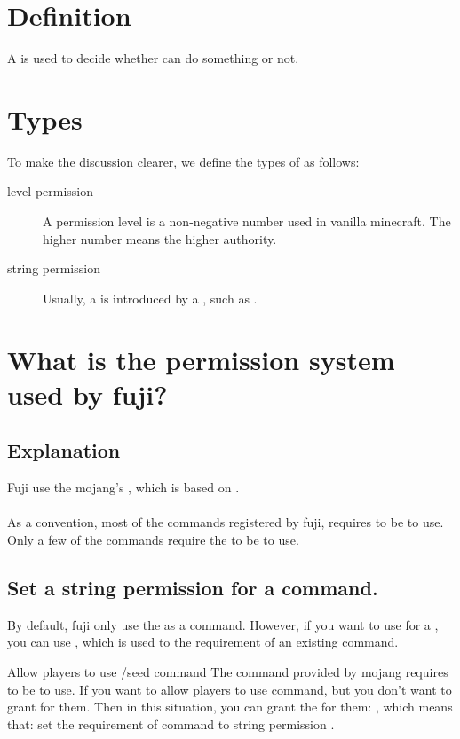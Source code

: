 \section{Definition}
A  is used to decide whether  can do something or not.


\section{Types}
To make the discussion clearer, we define the types of  as follows:
\begin{description}
    \item [level permission] A permission level is a non-negative number used in vanilla minecraft.
    The higher number means the higher authority.
    \item[string permission] Usually, a  is introduced by a , such as .
\end{description}


\section{What is the permission system used by fuji?}

\subsection{Explanation}
Fuji use the mojang's , which is based on .
\\
\\
As a convention, most of the commands registered by fuji, requires  to be  to use.
Only a few of the commands require the  to be  to use.

\subsection{Set a string permission for a command.}
By default, fuji only use the  as  a command.
However, if you want to use  for a , you can use , which is used to  the requirement of an existing command.

\begin{example}{Allow players to use /seed command}
    The command  provided by mojang requires  to be  to use.
    If you want to allow players to use  command, but you don't want to grant  for them.
    Then in this situation, you can grant the  for them: , which means that: set the requirement of command  to string permission .
\end{example}

